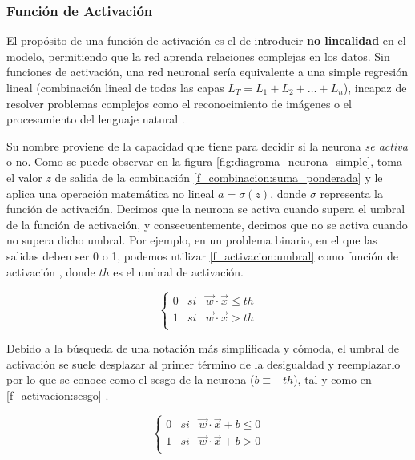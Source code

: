 \subsubsection{Función de Activación}\label{f_activacion}

El propósito de una función de activación es el de introducir \textbf{no linealidad} en el modelo, permitiendo que la red aprenda relaciones complejas en los datos. Sin funciones de activación, una red neuronal sería equivalente a una simple regresión lineal (combinación lineal de todas las capas $L_T = L_1 + L_2 + \dots + L_n$), incapaz de resolver problemas complejos como el reconocimiento de imágenes o el procesamiento del lenguaje natural \cite{dl_python__chollet_2021, dl_fundamentos__casas_roma_2020}.

Su nombre proviene de la capacidad que tiene para decidir si la neurona \textit{se activa} o no. Como se puede observar en la figura \ref{fig:diagrama_neurona_simple}, toma el valor $z$ de salida de la combinación \eqref{f_combinacion:suma_ponderada} y le aplica una operación matemática no lineal $a = \sigma(z)$, donde $\sigma$ representa la función de activación. Decimos que la neurona se activa cuando supera el umbral de la función de activación, y consecuentemente, decimos que no se activa cuando no supera dicho umbral. Por ejemplo, en un problema binario, en el que las salidas deben ser 0 o 1, podemos utilizar \ref{f_activacion:umbral} como función de activación \cite{nn_dl__michael_nielsen_2015}, donde $th$ es el umbral de activación.

\begin{equation}\label{f_activacion:umbral}
\left \{
    \begin{array}{ccc}
    0 & si & \vec{w}\cdot\vec{x} \leq th \\
    1 & si & \vec{w}\cdot\vec{x} > th \\
    \end{array}
\right .
\end{equation}

Debido a la búsqueda de una notación más simplificada y cómoda, el umbral de activación se suele desplazar al primer término de la desigualdad y reemplazarlo por lo que se conoce como el sesgo de la neurona ($b \equiv -th$), tal y como en \ref{f_activacion:sesgo} \cite{nn_dl__michael_nielsen_2015}.

\begin{equation}\label{f_activacion:sesgo}
\left \{
    \begin{array}{ccc}
    0 & si & \vec{w}\cdot\vec{x} + b\leq 0 \\
    1 & si & \vec{w}\cdot\vec{x} + b > 0 \\
    \end{array}
\right .
\end{equation}

